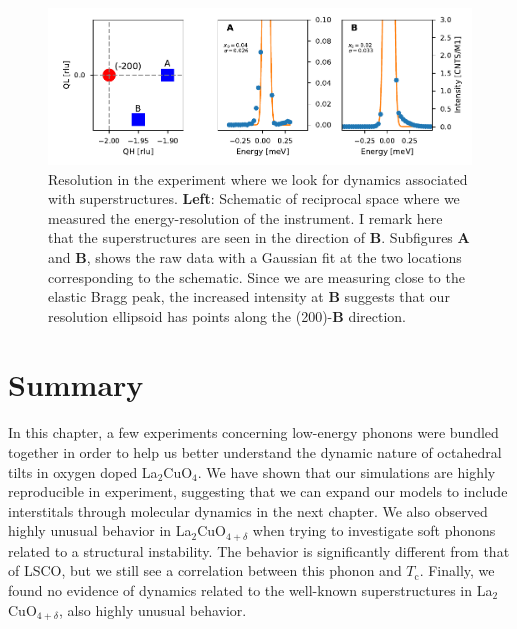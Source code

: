 \begin{figure}
    \centering
    \includegraphics[width=\textwidth]{fig/lowen/resolution_phasons.pdf}
    \caption{Resolution in the experiment where we look for dynamics associated with superstructures. \textbf{Left}: Schematic of reciprocal space where we measured the energy-resolution of the instrument. I remark here that the superstructures are seen in the direction of \textbf{B}. Subfigures \textbf{A} and \textbf{B}, shows the raw data with a Gaussian fit at the two locations corresponding to the schematic. Since we are measuring close to the elastic Bragg peak, the increased intensity at \textbf{B} suggests that our resolution ellipsoid has points along the (200)-\textbf{B} direction.}
    \label{fig:phason_resolution}
\end{figure}

\section{Summary}
In this chapter, a few experiments concerning low-energy phonons were bundled together in order to help us better understand the dynamic nature of octahedral tilts in oxygen doped La$_2$CuO$_4$. We have shown that our simulations are highly reproducible in experiment, suggesting that we can expand our models to include interstitals through molecular dynamics in the next chapter. We also observed highly unusual behavior in La$_2$CuO$_{4+\delta}$ when trying to investigate soft phonons related to a structural instability. The behavior is significantly different from that of LSCO, but we still see a correlation between this phonon and $T_\text{c}$. Finally, we found no evidence of dynamics related to the well-known superstructures in La$_2$CuO$_{4+\delta}$, also highly unusual behavior.